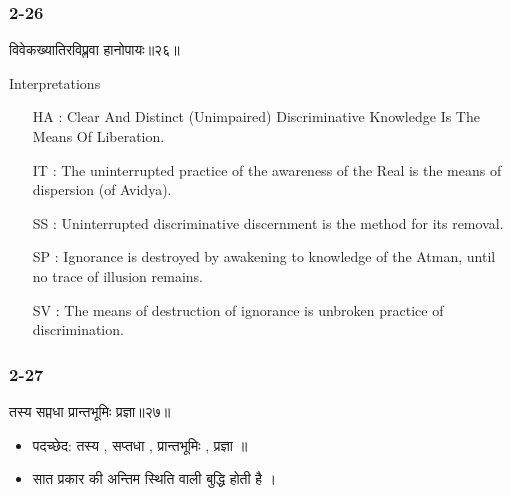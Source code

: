 \begin{frame}[fragile]\frametitle{2-26}
\begin{sanskrit}
विवेकख्यातिरविप्लवा हानोपायः॥२६॥
\end{sanskrit}

Interpretations
\begin{itemize}
\item [HA]: Clear And Distinct (Unimpaired) Discriminative Knowledge Is The Means Of Liberation.
\item [IT]: The uninterrupted practice of the awareness of the Real is the means of dispersion (of Avidya).
\item [SS]: Uninterrupted discriminative discernment is the method for its removal.
\item [SP]: Ignorance is destroyed by awakening to knowledge of the Atman, until no trace of illusion remains.
\item [SV]: The means of destruction of ignorance is unbroken practice of discrimination. 
\end{itemize}
	
\end{frame}


\begin{frame}[fragile]\frametitle{2-27}
\begin{sanskrit}
तस्य सप्तधा प्रान्तभूमिः प्रज्ञा॥२७॥
\end{sanskrit}

\begin{itemize}
\item पदच्छेद: तस्य , सप्तधा , प्रान्तभूमिः , प्रज्ञा ॥
\item सात प्रकार की अन्तिम स्थिति वाली बुद्धि होती है ।
\end{itemize}
	
\end{frame}



